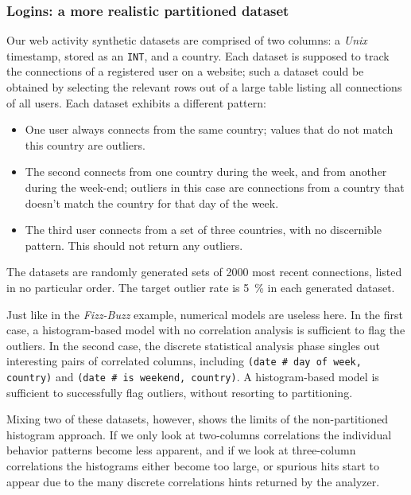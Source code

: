 \subsubsection{Logins: a more realistic partitioned dataset}

Our web activity synthetic datasets are comprised of two columns: a \emph{Unix} timestamp, stored as an \texttt{INT}, and a country. Each dataset is supposed to track the connections of a registered user on a website; such a dataset could be obtained by selecting the relevant rows out of a large table listing all connections of all users. Each dataset exhibits a different pattern:

\begin{itemize}
\item One user always connects from the same country; values that do not match this country are outliers.
\item The second connects from one country during the week, and from another during the week-end; outliers in this case are connections from a country that doesn't match the country for that day of the week.
\item The third user connects from a set of three countries, with no discernible pattern. This should not return any outliers.
\end{itemize}

The datasets are randomly generated sets of 2000 most recent connections, listed in no particular order. The target outlier rate is \SI{5}{\percent} in each generated dataset.

Just like in the \emph{Fizz-Buzz} example, numerical models are useless here. In the first case, a histogram-based model with no correlation analysis is sufficient to flag the outliers. In the second case, the discrete statistical analysis phase singles out interesting pairs of correlated columns, including \texttt{(date\,\#\,day of week, country)} and \texttt{(date\,\#\,is weekend, country)}. A histogram-based model is sufficient to successfully flag outliers, without resorting to partitioning.


Mixing two of these datasets, however, shows the limits of the non-partitioned histogram approach. If we only look at two-columns correlations the individual behavior patterns become less apparent, and if we look at three-column correlations the histograms either become too large, or spurious hits start to appear due to the many discrete correlations hints returned by the analyzer.

